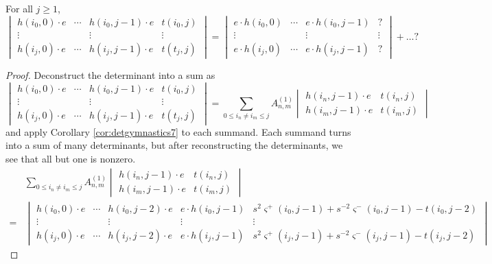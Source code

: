 \begin{lemma}
For all $j \geq 1$,
\[
\begin{vmatrix}
h(i_0, 0) \cdot e & \cdots & h(i_0, j-1) \cdot e & t(i_0, j) \\
\vdots & & \vdots & \vdots \\
h(i_{j}, 0) \cdot e & \cdots & h(i_{j}, j-1) \cdot e & t(t_{j}, j)
\end{vmatrix}
= 
\begin{vmatrix}
e \cdot h(i_0, 0) & \cdots & e \cdot h(i_0, j-1) & ? \\
\vdots & & \vdots & \vdots \\
e \cdot h(i_{j}, 0) & \cdots & e \cdot h(i_{j}, j-1) & ?
\end{vmatrix}
+ \dots ?
\]
\end{lemma}
\begin{proof}
Deconstruct the determinant into a sum as
\[
\begin{vmatrix}
h(i_0, 0) \cdot e & \cdots & h(i_0, j-1) \cdot e & t(i_0, j) \\
\vdots & & \vdots & \vdots \\
h(i_{j}, 0) \cdot e & \cdots & h(i_{j}, j-1) \cdot e & t(t_{j}, j)
\end{vmatrix}
=
\sum_{0 \leq i_n \neq i_m \leq j} A_{n, m}^{(1)} 
\begin{vmatrix}
h(i_n, j-1) \cdot e & t(i_n, j) \\
h(i_m, j-1) \cdot e & t(i_m, j)
\end{vmatrix}
\]
and apply Corollary \ref{cor:detgymnastics7} to each summand. Each summand turns into a sum of many determinants, but after reconstructing the determinants, we see that all but one is nonzero. 
\begin{align*}
& \sum_{0 \leq i_n \neq i_m \leq j} A_{n, m}^{(1)} 
\begin{vmatrix}
h(i_n, j-1) \cdot e & t(i_n, j) \\
h(i_m, j-1) \cdot e & t(i_m, j)
\end{vmatrix} \\
= & 
\begin{vmatrix}
h(i_0, 0) \cdot e & \cdots & h(i_0, j-2) \cdot e & e \cdot h(i_0, j-1) &  s^2 \varsigma^+(i_0, j-1) + s^{-2} \varsigma^-(i_0, j-1) - t(i_0, j-2)  \\
\vdots & & \vdots & \vdots & \vdots \\
h(i_{j}, 0) \cdot e & \cdots & h(i_j, j-2) \cdot e & e \cdot h(i_{j}, j-1) & s^2 \varsigma^+(i_j, j-1) + s^{-2} \varsigma^-(i_j, j-1) - t(i_j, j-2)
\end{vmatrix}
\end{align*}
\end{proof}

